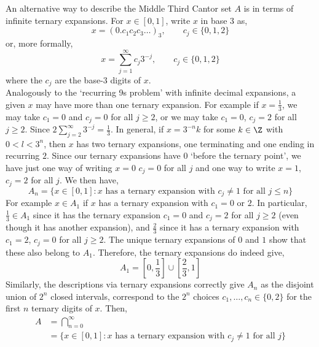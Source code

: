 
\noindent
An alternative way to describe the Middle Third Cantor set $A$ is in terms of infinite ternary expansions. For $x \in [0, 1]$, write $x$ in base $3$ as,
$$ x = (0.c_1c_2c_3 \dots)_3, \qquad c_j \in \{0, 1, 2\} $$
or, more formally,
$$ x = \sum_{j=1}^\infty c_j3^{-j}, \qquad c_j \in \{0, 1, 2\} $$
where the $c_j$ are the base-$3$ digits of $x$.\\

\noindent
Analogously to the `recurring 9s problem' with infinite decimal expansions, a given $x$ may have more than one ternary expansion. For example if $x = \frac{1}{3}$, we may take $c_1 = 0$ and $c_j = 0$ for all $j \ge 2$, or we may take $c_1 = 0$, $c_j = 2$ for all $j \ge 2$. Since $2\sum_{j=2}^\infty 3^{-j} = \frac{1}{3}$. In general, if $x = 3^{-n}k$ for some $k \in \Z$
with $0 < l < 3^n$, then $x$ has two ternary expansions, one terminating and one ending in recurring $2$. Since our ternary expansions have $0$ `before the ternary point', we have just one way of writing $x = 0$ $c_j = 0$ for all $j$ and one way to write $x = 1$, $c_j = 2$ for all $j$. We then have,
$$ A_n = \{x \in [0, 1] : x \text{ has a ternary expansion with } c_j \ne 1 \text{ for all } j \le n\} $$
For example $x \in A_1$ if $x$ has a ternary expansion with $c_1 = 0$ or $2$. In particular, $\frac{1}{3}\in A_1$ since it has the ternary expansion $c_1 = 0$ and $c_j = 2$ for all $j \ge 2$ (even though it has another expansion), and $\frac{2}{3}$ since it has a ternary expansion with $c_1 = 2$, $c_j = 0$ for all
$j \ge 2$. The unique ternary expansions of $0$ and $1$ show that these also belong to $A_1$. Therefore, the ternary expansions do indeed give,
$$ A_1 = \left[ 0 , \frac{1}{3} \right] \cup \left[ \frac{2}{3}, 1 \right] $$
Similarly, the descriptions via ternary expansions correctly give $A_n$ as the disjoint union of $2^n$ closed intervals, correspond to the $2^n$ choices $c_1, \dots, c_n \in \{0 ,2 \}$ for the first $n$ ternary digits of $x$. Then,
\begin{align*}
  A &= \bigcap_{n=0}^\infty \\
  &= \{x \in [0, 1] : x \text{ has a ternary expansion with } c_j \ne 1 \text{ for all } j \}
\end{align*}

